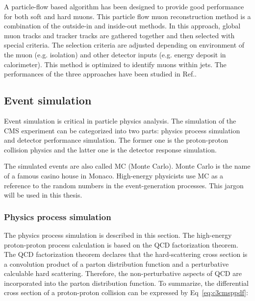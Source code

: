 A particle-flow based algorithm has been designed to provide good performance for both soft and hard muons. This particle flow muon reconstruction method is a combination of the outside-in and inside-out methods. In this approach, global muon tracks and tracker tracks are gathered together and then selected with special criteria. The selection criteria are adjusted depending on environment of the muon (e.g. isolation) and other detector inputs (e.g. energy deposit in calorimeter). This method is optimized to identify muons within jets. The performances of the three approaches have been studied in Ref.\cite{Chatrchyan:2012xi}. 

\subsection{Event simulation}
Event simulation is critical in particle physics analysis. The simulation of the CMS experiment can be categorized into two parts: physics process simulation and detector performance simulation. The former one is the proton-proton collision physics and the latter one is the detector response simulation. 

The simulated events are also called MC (Monte Carlo). Monte Carlo is the name of a famous casino house in Monaco. High-energy physicists use MC as a reference to the random numbers in the event-generation processes. This jargon will be used in this thesis. 

\subsubsection{Physics process simulation}

The physics process simulation is described in this section. The high-energy proton-proton process calculation is based on the QCD factorization theorem\cite{Collins:1989gx}. The QCD factorization theorem declares that the hard-scattering cross section is a convolution product of a parton distribution function and a perturbative calculable hard scattering. Therefore, the non-perturbative aspects of QCD are incorporated into the parton distribution function. To summarize, the differential cross section of a proton-proton collision can be expressed by Eq~\ref{eq:c3cmsppdf}:

